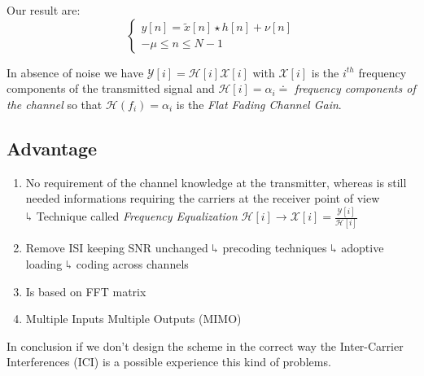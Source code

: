 Our result are:
\begin{equation}
\begin{cases}
y[n] = \widetilde{x}[n] \star h[n] + \nu[n]\\
-\mu \leq n \leq N - 1
\end{cases}
\end{equation}

In absence of noise we have $\mathcal{Y}[i] = \mathcal{H}[i]\mathcal{X}[i]$ with $\mathcal{X}[i]$ is the $i^{th}$ frequency components of the transmitted signal and $\mathcal{H}[i] = \alpha_i \doteq$ \textit{frequency components of the channel} so that $\mathcal{H}(f_i) = \alpha_i$ is the \emph{Flat Fading Channel Gain}.

\subsection{Advantage}
\begin{enumerate}
\item No requirement of the channel knowledge at the transmitter, whereas is still needed informations requiring the carriers at the receiver point of view\\
$\rotatebox[origin=c]{180}{$\Lsh$}$ Technique called \emph{Frequency Equalization} $\mathcal{H}[i] \rightarrow \mathcal{X}[i] = \frac{\mathcal{Y}[i]}{\mathcal{H}[i]}$
\item Remove ISI keeping SNR unchanged
$\rotatebox[origin=c]{180}{$\Lsh$}$ precoding techniques
$\rotatebox[origin=c]{180}{$\Lsh$}$ adoptive loading
$\rotatebox[origin=c]{180}{$\Lsh$}$ coding across channels
\item Is based on FFT matrix
\item Multiple Inputs Multiple Outputs (MIMO)
\end{enumerate}

In conclusion if we don't design the scheme in the correct way the Inter-Carrier Interferences (ICI) is a possible experience this kind of problems.




























